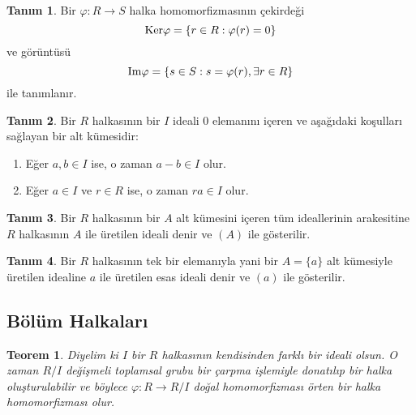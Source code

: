 \documentclass{article}
\newtheorem{thm}{Teorem}[section]
\theoremstyle{definition}
\newtheorem{defn}{Tanım}[section]
\theoremstyle{remark}
\begin{document}
    		\begin{defn}
    		    Bir $\varphi: R \to S$ halka homomorfizmasının çekirdeği
    			\begin{equation*}
    				\textup{Ker}\varphi = \{r \in R : \varphi(r) = 0\}
    			\end{equation*}
    			ve görüntüsü
    			\begin{equation*}
    				\textup{Im}\varphi = \{s \in S : s = \varphi(r), \exists r \in R\}
    			\end{equation*}
    			ile tanımlanır.
    		\end{defn}
    		
    		\begin{defn}
    		    Bir $R$ halkasının bir $I$ ideali 0 elemanını içeren ve aşağıdaki koşulları sağlayan bir alt kümesidir:
    			\begin{enumerate}	\renewcommand{\labelenumi}{(\roman{enumi})}
    				\item Eğer $a, b \in I$ ise, o zaman $a - b \in I$ olur.
    				\item Eğer $a \in I$ ve $r \in R$ ise, o zaman $ra \in I$ olur.
    			\end{enumerate}
    		\end{defn}
    		
    		\begin{defn}
    		    Bir $R$ halkasının bir $A$ alt kümesini içeren tüm ideallerinin arakesitine $R$ halkasının $A$ ile üretilen ideali denir ve $(A)$ ile gösterilir.
    		\end{defn}
    		
    		\begin{defn}
    		    Bir $R$ halkasının tek bir elemanıyla yani bir $A = \{a\}$ alt kümesiyle üretilen idealine $a$ ile üretilen esas ideali denir ve $(a)$ ile gösterilir.
    		\end{defn}
    		
    	\subsection{Bölüm Halkaları}
    	
    	    \begin{thm}
    	        Diyelim ki $I$ bir $R$ halkasının kendisinden farklı bir ideali olsun. O zaman $R/I$ değişmeli toplamsal grubu bir çarpma işlemiyle donatılıp bir halka oluşturulabilir ve böylece $\varphi: R \to R/I$ doğal homomorfizması örten bir halka homomorfizması olur.
    	    \end{thm}
    	    
\end{document}
